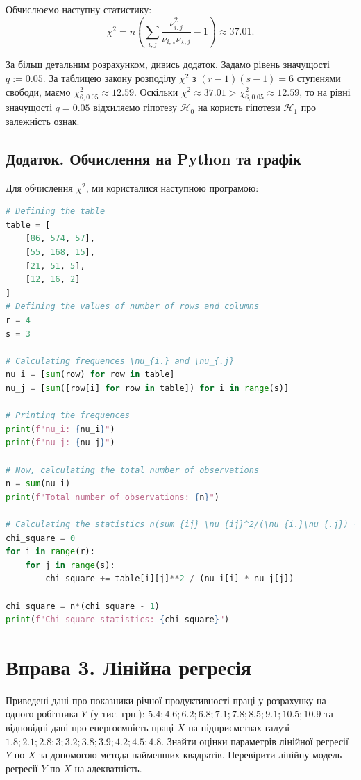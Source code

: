 \documentclass{../hw_template}
\begin{document}
Обчислюємо наступну статистику:
\begin{equation*}
    \chi^2 = n\left(\sum_{i,j}\frac{\nu_{i,j}^2}{\nu_{i,\star}\nu_{\star,j}}-1\right) \approx 37.01.
\end{equation*}

За більш детальним розрахунком, дивись додаток. Задамо рівень значущості $q:=0.05$. За таблицею 
закону розподілу $\chi^2$ з $(r-1)(s-1)=6$ ступенями свободи, маємо $\chi_{6,0.05}^2 \approx 12.59$.
Оскільки $\chi^2 \approx 37.01 > \chi_{6,0.05}^2 \approx 12.59$, то на рівні значущості $q=0.05$
відхиляємо гіпотезу $\mathcal{H}_0$ на користь гіпотези $\mathcal{H}_1$ про залежність ознак.

\subsection{Додаток. Обчислення на Python та графік} 
Для обчислення $\chi^2$, ми користалися наступною програмою:
\begin{lstlisting}[language=Python]
# Defining the table
table = [
    [86, 574, 57],
    [55, 168, 15],
    [21, 51, 5],
    [12, 16, 2]
]
# Defining the values of number of rows and columns
r = 4
s = 3

# Calculating frequences \nu_{i.} and \nu_{.j}
nu_i = [sum(row) for row in table]
nu_j = [sum([row[i] for row in table]) for i in range(s)]

# Printing the frequences
print(f"nu_i: {nu_i}")
print(f"nu_j: {nu_j}")

# Now, calculating the total number of observations
n = sum(nu_i)
print(f"Total number of observations: {n}")

# Calculating the statistics n(sum_{ij} \nu_{ij}^2/(\nu_{i.}\nu_{.j}) - 1)
chi_square = 0
for i in range(r):
    for j in range(s):
        chi_square += table[i][j]**2 / (nu_i[i] * nu_j[j])

chi_square = n*(chi_square - 1)
print(f"Chi square statistics: {chi_square}")
\end{lstlisting}

\newpage

\section{Вправа 3. Лінійна регресія}

\begin{problem}
    Приведені дані про показники річної продуктивності праці у розрахунку
на одного робітника $Y$ (у тис. грн.): $5.4; 4.6; 6.2; 6.8; 7.1; 7.8; 8.5; 9.1; 10.5; 10.9$
та відповідні дані про енергоємність праці $X$ на підприємствах галузі $1.8; 2.1;
2.8; 3; 3.2; 3.8; 3.9; 4.2; 4.5; 4.8$. Знайти оцінки параметрів лінійної регресії
$Y$ по $X$ за допомогою метода найменших квадратів. Перевірити лінійну модель
регресії $Y$ по $X$ на адекватність.
\end{problem}
\end{document}
